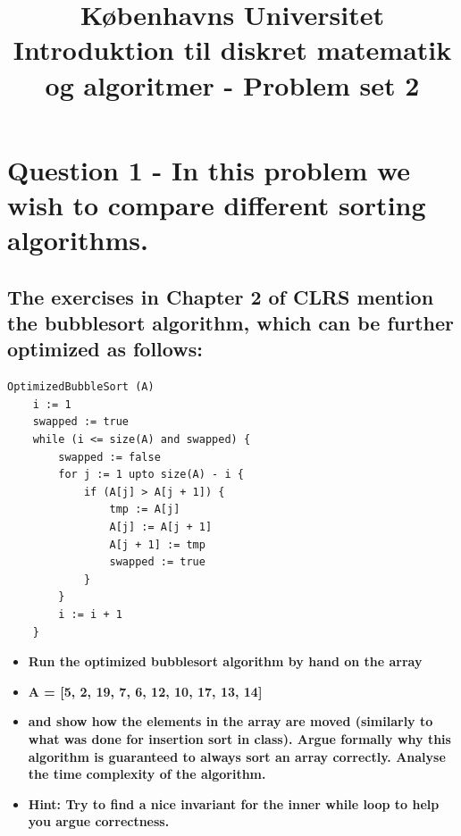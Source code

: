 \documentclass[a4paper,12pt]{article}
\begin{document}
% 

\title{Københavns Universitet\\
Introduktion til diskret matematik og algoritmer - Problem set 2}
\maketitle %

\section[Question 1]{Question 1 - In this problem we wish to compare different sorting algorithms.}

\subsection[]{The exercises in Chapter 2 of CLRS mention the bubblesort algorithm, which can be further optimized as follows:}
\begin{lstlisting}
OptimizedBubbleSort (A)
    i := 1
    swapped := true
    while (i <= size(A) and swapped) {
        swapped := false
        for j := 1 upto size(A) - i {
            if (A[j] > A[j + 1]) {
                tmp := A[j]
                A[j] := A[j + 1]
                A[j + 1] := tmp
                swapped := true
            }
        }
        i := i + 1
    }
\end{lstlisting}
\begin{itemize}
    \item [] \textbf{Run the optimized bubblesort algorithm by hand on the array}
    \item [] \textbf{A = [5, 2, 19, 7, 6, 12, 10, 17, 13, 14]}
    \item [] \textbf{and show how the elements in the array are moved (similarly to what was done for insertion sort in class). Argue formally why this algorithm is guaranteed to always sort an array correctly. Analyse the time complexity of the algorithm.}
    \item [] \textbf{Hint: Try to find a nice invariant for the inner while loop to help you argue correctness.}
\end{itemize}
\end{document}
